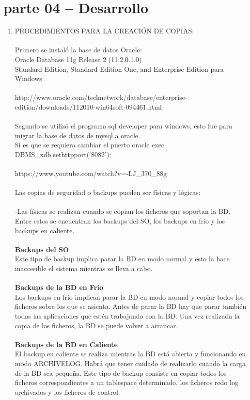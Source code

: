 \section{parte 04 – Desarrollo} 

\begin{enumerate}[1.]
	\item PROCEDIMIENTOS PARA LA CREACIÓN DE COPIAS:
\\
\\Primero se instaló la base de datos Oracle:
\\Oracle Database 11g Release 2 (11.2.0.1.0)
\\Standard Edition, Standard Edition One, and Enterprise Edition para Windows
\\
\\http://www.oracle.com/technetwork/database/enterprise-edition/downloads/112010-win64soft-094461.html
\\
\\Segundo se utilizó el programa sql developer para windows, esto fue para migrar la base de datos de mysql a oracle.
\\Si es que se requiera cambiar el puerto  oracle exec DBMS\_xdb.sethttpport(‘8082’);
\\
\\https://www.youtube.com/watch?v=-LJ\_370\_88g
\\
\\Las copias de seguridad o backups pueden ser físicas y lógicas:
\\
\\-Las físicas se realizan cuando se copian los ficheros que soportan la BD. Entre estos se encuentran los backups del SO, los backups en frío y los backups en caliente.
\\
\\
\textbf{ Backups del SO}         
\\           Este tipo de backup implica parar la BD en modo normal y esto la hace inaccesible el sistema mientras se lleva a cabo.
\\
\\
\textbf{ Backups de la BD en Frio}         
\\          Los backups en frio implican parar la BD en modo normal y copiar todos los ficheros sobre los que se asienta. Antes de parar la BD hay que parar también todas las aplicaciones que estén trabajando con la BD. Una vez realizada la copia de los ficheros, la BD se puede volver a arrancar.
\\
\\
\textbf{Backups de la BD en Caliente}            
\\          El backup en caliente se realiza mientras la BD está abierta y funcionando en modo ARCHIVELOG. Habrá que tener cuidado de realizarlo cuando la carga de la BD sea pequeña. Este tipo de backup consiste en copiar todos los ficheros correspondientes a un tablespace determinado, los ficheros redo log archivados y los ficheros de control.
\\


\end{enumerate}
